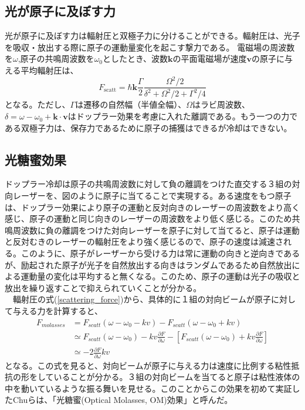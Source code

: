 \documentclass[uplatex,dvipdfmx,a4paper,report,papersize,11pt]{jsbook}
\begin{document}
\subsection{光が原子に及ぼす力}
 光が原子に及ぼす力は輻射圧と双極子力に分けることができる。輻射圧は、光子を吸収・放出する際に原子の運動量変化を起こす撃力である\cite{ノーベル賞と分光学}。
 電磁場の周波数を$\omega$,原子の共鳴周波数を$\omega_0$としたとき、波数$\bm k$の平面電磁場が速度$\bm v$の原子に与える平均輻射圧は、
 \begin{equation}\label{scattering_force}
F _ { \mathrm { scatt } } = \hbar \bm{k}\frac { \Gamma } { 2 } \frac { \Omega ^ { 2 } / 2 } { \delta ^ { 2 } + \Omega ^ { 2 } / 2 + \Gamma ^ { 2 } / 4 }
 \end{equation}
となる\cite{Foot:1080846}。ただし、$\Gamma$は遷移の自然幅（半値全幅）、$\Omega$はラビ周波数、$\delta = \omega - \omega _ { 0 } + \bm{k} \cdot \bm{v}$はドップラー効果を考慮に入れた離調である。もう一つの力である双極子力は、保存力であるために原子の捕獲はできるが冷却はできない\cite{ノーベル賞と分光学}。

\subsection{光糖蜜効果}
ドップラー冷却は原子の共鳴周波数に対して負の離調をつけた直交する３組の対向レーザーを、図のように原子に当てることで実現する。ある速度をもつ原子は、ドップラー効果により原子の運動と反対向きのレーザーの周波数をより高く感じ、原子の運動と同じ向きのレーザーの周波数をより低く感じる。このため共鳴周波数に負の離調をつけた対向レーザーを原子に対して当てると、原子は運動と反対むきのレーザーの輻射圧をより強く感じるので、原子の速度は減速される。このように、原子がレーザーから受ける力は常に運動の向きと逆向きであるが、励起された原子が光子を自然放出する向きはランダムであるため自然放出による運動量の変化は平均すると無くなる。このため、原子の運動は光子の吸収と放出を繰り返すことで抑えられていくことが分かる。\\
　輻射圧の式(\ref{scattering_force})から、具体的に１組の対向ビームが原子に対して与える力を計算すると、
\begin{equation}
  \begin{split}
    F _ { molasses } &= F _ { scatt  } \left( \omega - \omega _ { 0 } - k v \right) - F _ {  scatt }  \left( \omega - \omega _ { 0 } + k v \right)
    \\& \simeq F _ { scatt  } \left( \omega - \omega _ { 0 } \right) - k v \frac { \partial F } { \partial \omega } - \left[ F _ {  scatt } \left( \omega - \omega _ { 0 } \right) + k v \frac { \partial F } { \partial \omega } \right]
    \\& \simeq - 2 \frac { \partial F } { \partial \omega } k v
  \end{split}
\end{equation}
となる。この式を見ると、対向ビームが原子に与える力は速度に比例する粘性抵抗の形をしていることが分かる。３組の対向ビームを当てると原子は粘性液体の中を動いているような振る舞いを見せる。このことからこの効果を初めて実証したChuらは、「光糖蜜(Optical Molasses, OM)効果」と呼んだ。
\end{document}
